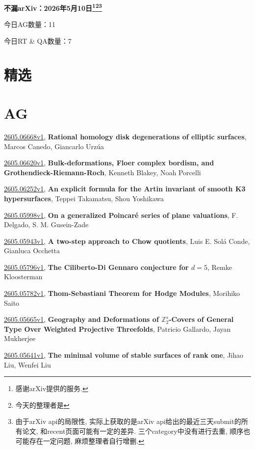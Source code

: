 \documentclass[9pt, a4paper]{article}
\theoremstyle{plain}
\theoremstyle{definition}
\theoremstyle{remark}
\newcommand{\arxiv}[3]{\href{https://arxiv.org/abs/#1}{#1}, \textbf{\textcolor{arxivblue}{#2}}, #3}
\newcommand{\AGnumber}{11}
\newcommand{\RTQAnumber}{7}
\newcommand{\NewestDate}{2026年5月10日}
\newcommand{\todayarXiver}{} %
\begin{document}
\begin{center}
    \Huge\textbf{不漏arXiv：\NewestDate\footnote{感谢arXiv提供的服务.}\footnote{今天的整理者是\todayarXiver}\footnote{由于arXiv api的局限性, 实际上获取的是arXiv api给出的最近三天submit的所有论文, 和recent页面可能有一定的差异. 三个category中没有进行去重, 顺序也可能存在一定问题, 麻烦整理者自行增删.}} \\
\end{center}

\setcounter{section}{-1}

\begin{center}
    今日AG数量：\AGnumber
    
    今日RT \& QA数量：\RTQAnumber
    
\end{center}


\section{精选}


\section{AG}
\arxiv{2605.06668v1}{Rational homology disk degenerations of elliptic surfaces}{Marcos Canedo, Giancarlo Urzúa}

\arxiv{2605.06620v1}{Bulk-deformations, Floer complex bordism, and Grothendieck-Riemann-Roch}{Kenneth Blakey, Noah Porcelli}

\arxiv{2605.06252v1}{An explicit formula for the Artin invariant of smooth K3 hypersurfaces}{Teppei Takamatsu, Shou Yoshikawa}

\arxiv{2605.05998v1}{On a generalized Poincaré series of plane valuations}{F. Delgado, S. M. Gusein-Zade}

\arxiv{2605.05943v1}{A two-step approach to Chow quotients}{Luis E. Solá Conde, Gianluca Occhetta}

\arxiv{2605.05796v1}{The Ciliberto-Di Gennaro conjecture for $d=5$}{Remke Kloosterman}

\arxiv{2605.05782v1}{Thom-Sebastiani Theorem for Hodge Modules}{Morihiko Saito}

\arxiv{2605.05665v1}{Geography and Deformations of $\mathbb{Z}_2^s$-Covers of General Type Over Weighted Projective Threefolds}{Patricio Gallardo, Jayan Mukherjee}

\arxiv{2605.05641v1}{The minimal volume of stable surfaces of rank one}{Jihao Liu, Wenfei Liu}
\end{document}
